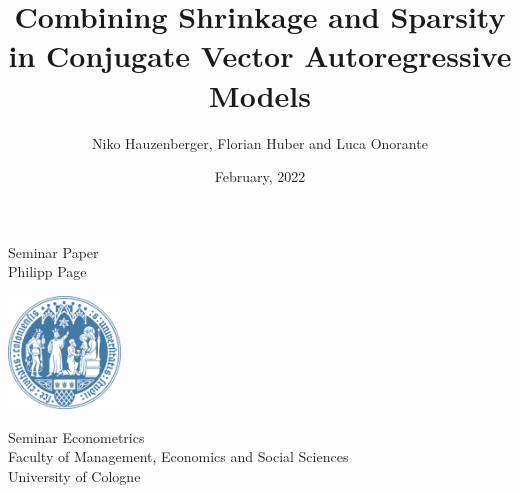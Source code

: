 \documentclass[a4paper,12pt]{article}
\title{Combining Shrinkage and Sparsity in Conjugate Vector Autoregressive Models}
\author{Niko Hauzenberger, Florian Huber and Luca Onorante}
\date{February, 2022}
\begin{document}
    \makeatletter %
    \begin{titlepage}
        \begin{center}
            \huge \@title
            
            \bigskip
            \large \@author
            
            \vfill
            
            \large Seminar Paper\\
            \Large Philipp Page
            
            \vfill
            
            \includegraphics[width=3cm]{figures/logo_wiso.png}
            \bigskip
            
            \large
            Seminar Econometrics\\
            Faculty of Management, Economics and Social Sciences\\
            University of Cologne
            
            \bigskip
            \@date
        \end{center}
    \end{titlepage}
    \makeatother %
    
    \tableofcontents
    \newpage
    

    
    
    
    
    
    
    \newpage
    \appendix
    
    
    \newpage
    \nocite{hauzenberger_combining_2021}
    \printbibliography
\end{document}
